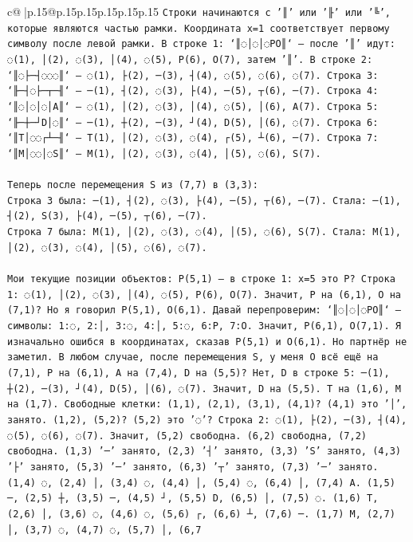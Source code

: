 \documentclass{article}
\begin{document}
{\begin{supertabular}{c@{$\;$}|p{.15\linewidth}@{}p{.15\linewidth}p{.15\linewidth}p{.15\linewidth}p{.15\linewidth}p{.15\linewidth}}
{{{\texttt{Строки начинаются с '║' или '╟' или '╚', которые являются частью рамки. Координата x=1 соответствует первому символу после левой рамки. В строке 1: `║◌│◌│◌PO║` — после '║' идут: ◌(1), │(2), ◌(3), │(4), ◌(5), P(6), O(7), затем '║'. В строке 2: `║◌├─┤◌◌◌║` — ◌(1), ├(2), ─(3), ┤(4), ◌(5), ◌(6), ◌(7). Строка 3: `╟─┤◌├─┬─╢` — ─(1), ┤(2), ◌(3), ├(4), ─(5), ┬(6), ─(7). Строка 4: `║◌│◌│◌│A║` — ◌(1), │(2), ◌(3), │(4), ◌(5), │(6), A(7). Строка 5: `╟─┼─┘D│◌║` — ─(1), ┼(2), ─(3), ┘(4), D(5), │(6), ◌(7). Строка 6: `║T│◌◌┌┴─╢` — T(1), │(2), ◌(3), ◌(4), ┌(5), ┴(6), ─(7). Строка 7: `║M│◌◌│◌S║` — M(1), │(2), ◌(3), ◌(4), │(5), ◌(6), S(7).} \\
\\ 
\texttt{Теперь после перемещения S из (7,7) в (3,3):} \\
\texttt{Строка 3 была: ─(1), ┤(2), ◌(3), ├(4), ─(5), ┬(6), ─(7). Стала: ─(1), ┤(2), S(3), ├(4), ─(5), ┬(6), ─(7).} \\
\texttt{Строка 7 была: M(1), │(2), ◌(3), ◌(4), │(5), ◌(6), S(7). Стала: M(1), │(2), ◌(3), ◌(4), │(5), ◌(6), ◌(7).} \\
\\ 
\texttt{Мои текущие позиции объектов: P(5,1) — в строке 1: x=5 это P? Строка 1: ◌(1), │(2), ◌(3), │(4), ◌(5), P(6), O(7). Значит, P на (6,1), O на (7,1)? Но я говорил P(5,1), O(6,1). Давай перепроверим: `║◌│◌│◌PO║` — символы: 1:◌, 2:│, 3:◌, 4:│, 5:◌, 6:P, 7:O. Значит, P(6,1), O(7,1). Я изначально ошибся в координатах, сказав P(5,1) и O(6,1). Но партнёр не заметил. В любом случае, после перемещения S, у меня O всё ещё на (7,1), P на (6,1), A на (7,4), D на (5,5)? Нет, D в строке 5: ─(1), ┼(2), ─(3), ┘(4), D(5), │(6), ◌(7). Значит, D на (5,5). T на (1,6), M на (1,7). Свободные клетки: (1,1), (2,1), (3,1), (4,1)? (4,1) это '│', занято. (1,2), (5,2)? (5,2) это '◌'? Строка 2: ◌(1), ├(2), ─(3), ┤(4), ◌(5), ◌(6), ◌(7). Значит, (5,2) свободна. (6,2) свободна, (7,2) свободна. (1,3) '─' занято, (2,3) '┤' занято, (3,3) 'S' занято, (4,3) '├' занято, (5,3) '─' занято, (6,3) '┬' занято, (7,3) '─' занято. (1,4) ◌, (2,4) │, (3,4) ◌, (4,4) │, (5,4) ◌, (6,4) │, (7,4) A. (1,5) ─, (2,5) ┼, (3,5) ─, (4,5) ┘, (5,5) D, (6,5) │, (7,5) ◌. (1,6) T, (2,6) │, (3,6) ◌, (4,6) ◌, (5,6) ┌, (6,6) ┴, (7,6) ─. (1,7) M, (2,7) │, (3,7) ◌, (4,7) ◌, (5,7) │, (6,7} \\
            }
        }
    }
     \\ \\


\end{supertabular}}
\end{document}
